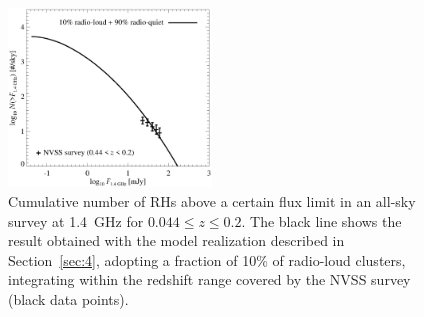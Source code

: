 \documentclass[traditabstract]{aa}
\begin{document}
\begin{appendix}
\begin{figure}[t]
\centering
\includegraphics[width=0.48\textwidth]{figures/RLF_1.4_flux_NVSS.eps}
\caption{Cumulative number of RHs above a certain flux limit in an all-sky
  survey at 1.4~GHz for $0.044 \leq z \leq 0.2$. The black line shows the result 
  obtained with the model realization described in Section~\ref{sec:4}, adopting 
  a fraction of 10\% of radio-loud clusters, integrating within the redshift range covered 
  by the NVSS survey (black data points).}
\label{fig:RLF1.4_fluxNVSS}
\end{figure}

\end{appendix}


\end{document}
